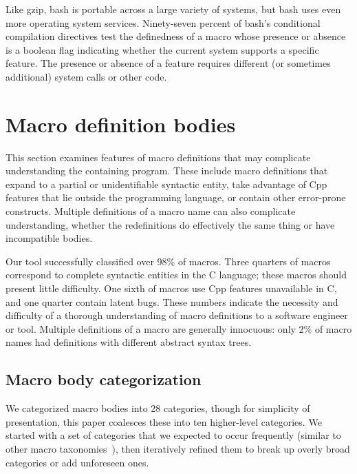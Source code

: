 \documentclass[10pt]{article}
\newcommand{\pkg}[1]{\textsf{#1}}
\begin{document}
Like \pkg{gzip}, \pkg{bash} is portable across a large variety of
systems, but \pkg{bash} uses even more operating system services.
Ninety-seven percent of \pkg{bash}'s conditional compilation directives
test the definedness of a macro whose presence or absence is a boolean
flag indicating whether the current system supports a specific feature.
The presence or absence of a feature requires different (or sometimes
additional) system calls or other code.


\section{Macro definition bodies}
\label{sec:categorization}

This section examines features of macro definitions that may complicate
understanding the containing program.  These include macro definitions that
expand to a partial or unidentifiable syntactic entity, take advantage of
Cpp features that lie outside the programming language, or contain other
error-prone constructs.  Multiple definitions of a macro name can also
complicate understanding, whether the redefinitions do effectively the same
thing or have incompatible bodies.

Our tool successfully classified over 98\% of macros.
Three quarters of macros correspond to complete
syntactic entities in the C language; these macros should present little
difficulty.  One sixth of macros use Cpp features unavailable in C, and one
quarter contain latent bugs.  These numbers indicate the necessity and
difficulty of a thorough understanding of macro definitions to a software
engineer or tool.  Multiple definitions of a macro are generally innocuous:
only 2\% of macro names had definitions with different abstract syntax
trees.



\subsection{Macro body categorization}

We categorized macro bodies into 28 categories, though for simplicity of
presentation, this paper coalesces these into ten higher-level categories.
We started with a set of categories that we expected to occur frequently
(similar to other macro
taxonomies~\cite{Stroustrup-DesignEvolution,Carroll95}), then iteratively
refined them to break up overly broad categories or add unforeseen ones.
\end{document}
